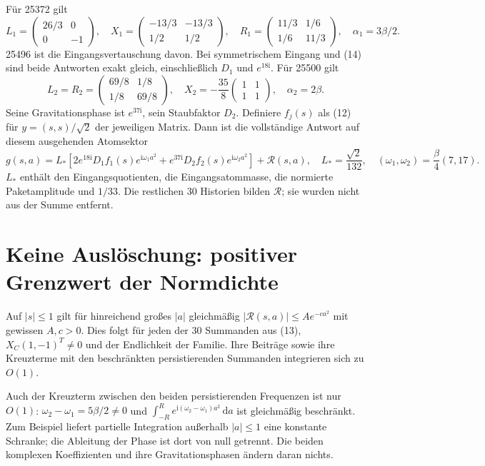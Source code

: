 \documentclass[10pt,a4paper]{article}
\newcommand{\dd}{\,\mathrm d}\newcommand{\ii}{\mathrm i}
\begin{document}
Für 25372 gilt
\[
 L_1=\begin{pmatrix}26/3&0\\0&-1\end{pmatrix},\quad
 X_1=\begin{pmatrix}-13/3&-13/3\\1/2&1/2\end{pmatrix},\quad
 R_1=\begin{pmatrix}11/3&1/6\\1/6&11/3\end{pmatrix},\quad\alpha_1=3\beta/2.
\]
25496 ist die Eingangsvertauschung davon. Bei symmetrischem Eingang und (14)
sind beide Antworten exakt gleich, einschließlich $D_1$ und $e^{18\ii}$.
Für 25500 gilt
\[
 L_2=R_2=\begin{pmatrix}69/8&1/8\\1/8&69/8\end{pmatrix},\quad
 X_2=-\frac{35}8\begin{pmatrix}1&1\\1&1\end{pmatrix},\quad\alpha_2=2\beta.
\]
Seine Gravitationsphase ist $e^{37\ii}$, sein Staubfaktor $D_2$.
Definiere $f_j(s)$ als (12) für $y=(s,s)/\sqrt2$ der jeweiligen Matrix.
Dann ist die vollständige Antwort auf diesem ausgehenden Atomsektor
\[
 g(s,a)=L_*\left[2e^{18\ii}D_1f_1(s)e^{\ii\omega_1 a^2}
                  +e^{37\ii}D_2f_2(s)e^{\ii\omega_2 a^2}\right]
                  +\mathcal R(s,a),\quad
 L_*=\frac{\sqrt2}{132},\quad
 (\omega_1,\omega_2)=\frac\beta4(7,17). \tag{16}
\]
$L_*$ enthält den Eingangsquotienten, die Eingangsatommasse, die normierte
Paketamplitude und $1/33$. Die restlichen 30 Historien bilden $\mathcal R$;
sie wurden nicht aus der Summe entfernt.
\newpage

\section{Keine Auslöschung: positiver Grenzwert der Normdichte}
Auf $|s|\le1$ gilt für hinreichend großes $|a|$ gleichmäßig
$|\mathcal R(s,a)|\le A e^{-c a^2}$ mit gewissen $A,c>0$.
Dies folgt für jeden der 30 Summanden aus (13), $X_C(1,-1)^T\ne0$
und der Endlichkeit der Familie. Ihre Beiträge sowie ihre Kreuzterme mit den
beschränkten persistierenden Summanden integrieren sich zu $O(1)$.

Auch der Kreuzterm zwischen den beiden persistierenden Frequenzen ist nur
$O(1)$: $\omega_2-\omega_1=5\beta/2\ne0$ und
$\int_{-R}^R e^{\ii(\omega_2-\omega_1)a^2}\dd a$ ist gleichmäßig beschränkt.
Zum Beispiel liefert partielle Integration außerhalb $|a|\le1$ eine konstante
Schranke; die Ableitung der Phase ist dort von null getrennt.
Die beiden komplexen Koeffizienten und ihre Gravitationsphasen ändern daran nichts.
\end{document}
